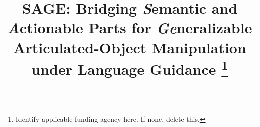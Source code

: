 \documentclass[letterpaper, 10 pt, conference]{ieeeconf}
\begin{document}
\title{\LARGE \bf
SAGE: Bridging \emph{S}emantic and \emph{A}ctionable Parts for 
\emph{Ge}neralizable Articulated-Object Manipulation under Language Guidance
\thanks{Identify applicable funding agency here. If none, delete this.}
}

\author{
}
\maketitle








\newpage




\end{document}
